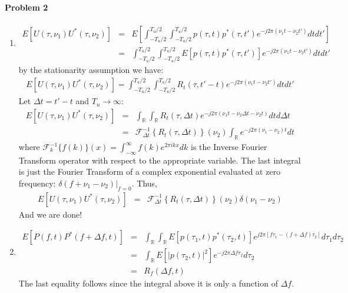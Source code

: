 \documentclass[12pt]{article}
\begin{document}
\paragraph{Problem 2}
\begin{enumerate}
\item
\begin{eqnarray*}
E\left[U(\tau,\nu_1)U^*(\tau,\nu_2)\right]&=&
E\left[\int_{-T_u/2}^{T_u/2}\int_{-T_u/2}^{T_u/2}p(\tau,t)p^*(\tau,t')e^{-j2\pi(\nu_1t-\nu_2t')}dtdt'\right]\\
&=&\int_{-T_u/2}^{T_u/2}\int_{-T_u/2}^{T_u/2}E\left[p(\tau,t)p^*(\tau,t')\right]e^{-j2\pi(\nu_1t-\nu_2t')}dt
dt'
\end{eqnarray*}
by the stationarity assumption we have:
\begin{eqnarray*}
E\left[U(\tau,\nu_1)U^*(\tau,\nu_2)\right]=
\int_{-T_u/2}^{T_u/2}\int_{-T_u/2}^{T_u/2}R_t(\tau,t'-t)e^{-j2\pi(\nu_1t-\nu_2t')}dt
dt'
\end{eqnarray*}
Let $\Delta t=t'-t$ and $T_u\rightarrow\infty$:
\begin{eqnarray*}
E\left[U(\tau,\nu_1)U^*(\tau,\nu_2)\right]&=&
\int_{\mathbb{R}}\int_{\mathbb{R}}R_t(\tau,\Delta
t)e^{-j2\pi(\nu_1t-\nu_2\Delta t-\nu_2t)}dt d\Delta t\\
&=&\mathcal{F}^{-1}_{\Delta t}\left\{R_t(\tau,\Delta
t)\right\}(\nu_2)\int_{\mathbb{R}}e^{-j2\pi(\nu_1-\nu_2)t}dt
\end{eqnarray*}
where $\mathcal{F}_k^{-1}\{f(k)\}(x)=\int_{-\infty}^\infty f(k) e^{2\pi i kx}dk$ is the Inverse Fourier Transform
operator with respect to the appropriate variable.  The last
integral is just the Fourier Transform of a complex exponential
evaluated at zero frequency: $\delta(f+\nu_1-\nu_2)|_{f=0}$.
Thus,
\begin{eqnarray*}
E\left[U(\tau,\nu_1)U^*(\tau,\nu_2)\right]&=&
\mathcal{F}^{-1}_{\Delta t}\left\{R_t(\tau,\Delta
t)\right\}(\nu_2)\delta(\nu_1-\nu_2)
\end{eqnarray*}
And we are done!
\item
\begin{eqnarray*}
E\left[P(f,t)P^*(f+\Delta
f,t)\right]&=&\int_{\mathbb{R}}\int_{\mathbb{R}}E\left[p(\tau_1,t)p^*(\tau_2,t)\right]e^{j2\pi\left[f\tau_1-(f+\Delta
f)\tau_2\right]}d\tau_1d\tau_2\\
&=&\int_{\mathbb{R}}E\left[|p(\tau_2,t)|^2\right]e^{-j2\pi\Delta
f\tau_2}d\tau_2\\
&=&R_f(\Delta f,t)
\end{eqnarray*}
The last equality follows since the integral above it is only a
function of $\Delta f$.
\end{enumerate}
\end{document}
